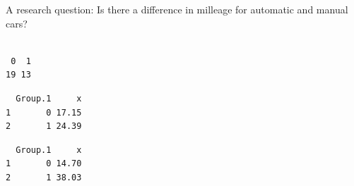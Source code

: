\begin{frame}[fragile]{A research question: Is there a difference in
milleage for automatic and manual cars?}

\begin{Shaded}
\begin{Highlighting}[]
\OperatorTok{$}
\end{Highlighting}
\end{Shaded}

\begin{verbatim}

 0  1 
19 13 
\end{verbatim}

\begin{Shaded}
\begin{Highlighting}[]
\OperatorTok{$} \OperatorTok{$}\NormalTok{)}
\end{Highlighting}
\end{Shaded}

\begin{verbatim}
  Group.1     x
1       0 17.15
2       1 24.39
\end{verbatim}

\begin{Shaded}
\begin{Highlighting}[]
\OperatorTok{$} \OperatorTok{$}\NormalTok{)}
\end{Highlighting}
\end{Shaded}

\begin{verbatim}
  Group.1     x
1       0 14.70
2       1 38.03
\end{verbatim}

\end{frame}

